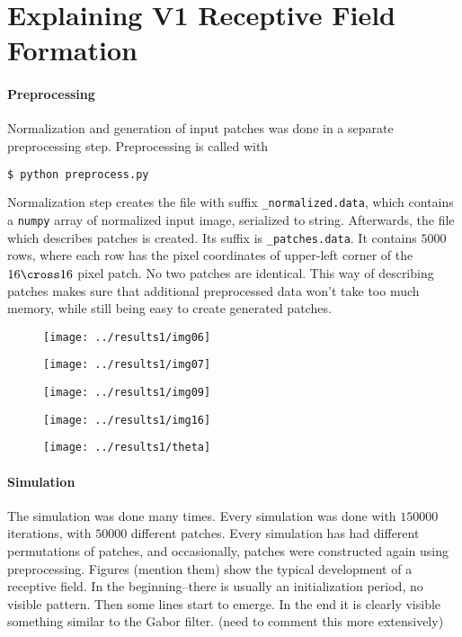\section{Explaining V1 Receptive Field Formation}

\paragraph{Preprocessing}
Normalization and generation of input patches was done in a separate
preprocessing step. Preprocessing is called with
\begin{lstlisting}[language=bash]
$ python preprocess.py
\end{lstlisting}
Normalization step creates the file with suffix \texttt{\_normalized.data},
which contains a \texttt{numpy} array of normalized input image, serialized to
string. Afterwards, the file which describes patches is created. Its suffix is
\texttt{\_patches.data}. It contains $5000$ rows, where each row has the pixel
coordinates of upper-left corner of the $16 \cross 16$ pixel patch. No two
patches are identical. This way of describing patches makes sure that additional
preprocessed data won't take too much memory, while still being easy to create
generated patches.

\begin{figure}[h]
\centering
\texttt{[image: ../results1/img06]}
\caption{}
\label{fig:img06}
\end{figure}

\begin{figure}[h]
\centering
\texttt{[image: ../results1/img07]}
\caption{}
\label{fig:img07}
\end{figure}

\begin{figure}[h]
\centering
\texttt{[image: ../results1/img09]}
\caption{}
\label{fig:img09}
\end{figure}

\begin{figure}[h]
\centering
\texttt{[image: ../results1/img16]}
\caption{}
\label{fig:img16}
\end{figure}

\begin{figure}[h]
\centering
\texttt{[image: ../results1/theta]}
\caption{}
\label{fig:theta}
\end{figure}

\paragraph{Simulation}
The simulation was done many times. Every simulation was done with $150000$
iterations, with $50000$ different patches. Every simulation has had different
permutations of patches, and occasionally, patches were constructed again using
preprocessing. Figures (mention them) show the typical development of a
receptive field. In the beginning--there is usually an initialization period, no
visible pattern. Then some lines start to emerge. In the end it is clearly
visible something similar to the Gabor filter. (need to comment this more
extensively)
